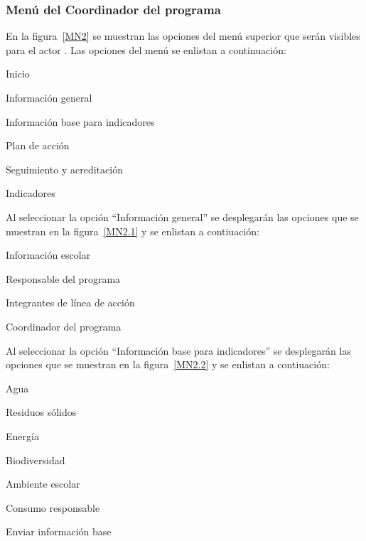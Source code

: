 \subsubsection{Menú del Coordinador del programa}

    En la figura~\ref{MN2} se muestran las opciones del menú superior que serán visibles para el actor . Las opciones del menú se enlistan a continuación:

    \begin{Citemize}
      \item Inicio
      \item Información general
      \item Información base para indicadores
      \item Plan de acción
      \item Seguimiento y acreditación
      \item Indicadores
    \end{Citemize}
    

   
 Al seleccionar la opción ``Información general'' se desplegarán las opciones que se muestran en la figura~\ref{MN2.1} y se enlistan a contiuación: 
    \begin{Citemize}
		\item Información escolar
		\item Responsable del programa		
		\item Integrantes de línea de acción
		\item Coordinador del programa				
    \end{Citemize}


 Al seleccionar la opción ``Información base para indicadores'' se desplegarán las opciones que se muestran en la figura~\ref{MN2.2} y se enlistan a contiuación: 
    \begin{Citemize}
		\item Agua
		\item Residuos sólidos
		\item Energía
		\item Biodiversidad
		\item Ambiente escolar		
		\item Consumo responsable		
		\item Enviar información base
    \end{Citemize}


